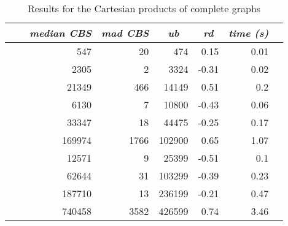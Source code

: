 \documentclass{scrartcl}
\theoremstyle{plain}
\newcommand{\cbs}{CBS}
\begin{document}
\begin{table}[!ht]
	\centering
	\scriptsize
	\begin{tabular}{|ll|rr|r|r|r|r|} 
	\hline
	\multicolumn{1}{|c}{} &
	\multicolumn{1}{c|}{} &
	\multicolumn{1}{c}{\emph{median \cbs{}}} &
	\multicolumn{1}{c|}{\emph{mad \cbs{}}} &
	\multicolumn{1}{c|}{\emph{ub}} &
	\multicolumn{1}{c|}{\emph{rd}} &
	\multicolumn{1}{c|}{\emph{time (s)}} \\ \hline
		
	\makeatletter{} &  & 547 & 20 & 474 & 0.15 & 0.01 \\ 
 &  & 2305 & 2 & 3324 & -0.31 & 0.02 \\ 
 &  & 21349 & 466 & 14149 & 0.51 & 0.2 \\ 
 &  & 6130 & 7 & 10800 & -0.43 & 0.06 \\ 
 &  & 33347 & 18 & 44475 & -0.25 & 0.17 \\ 
 &  & 169974 & 1766 & 102900 & 0.65 & 1.07 \\ 
 &  & 12571 & 9 & 25399 & -0.51 & 0.1 \\ 
 &  & 62644 & 31 & 103299 & -0.39 & 0.23 \\ 
 &  & 187710 & 13 & 236199 & -0.21 & 0.47 \\ 
 &  & 740458 & 3582 & 426599 & 0.74 & 3.46 \\ 
 
	
	\hline
	\end{tabular}
	\caption{\label{tab:cart_kk_perf}Results for the Cartesian products of 
complete graphs}

\end{table}
\end{document}
